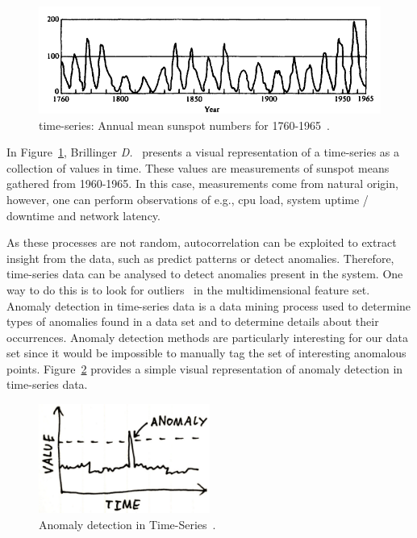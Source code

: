 \begin{figure}[H]
    \centering
    \includegraphics[width=1.00\textwidth]{images/time_series_example.pdf}
    \caption{time-series: Annual mean sunspot numbers for 1760-1965~\cite{Brillinger2006}.}
    \label{fig:time_series_example}
\end{figure}

In Figure~\ref{fig:time_series_example}, Brillinger \textit{D.}~\cite{Brillinger2006} presents a visual representation of a time-series as a collection of values in time. These values are measurements of sunspot means gathered from 1960-1965. In this case, measurements come from natural origin, however, one can perform observations of e.g., \gls{cpu} load, system uptime / downtime and network latency.

As these processes are not random, autocorrelation can be exploited to extract insight from the data, such as predict patterns or detect anomalies. Therefore, time-series data can be analysed to detect anomalies present in the system. One way to do this is to look for outliers~\cite{Liu2004} in the multidimensional feature set. Anomaly detection in time-series data is a data mining process used to determine types of anomalies found in a data set and to determine details about their occurrences. Anomaly detection methods are particularly interesting for our data set since it would be impossible to manually tag the set of interesting anomalous points. Figure~\ref{fig:time_series_anomaly_detection_example} provides a simple visual representation of anomaly detection in time-series data.

\begin{figure}[H]
    \centering
    \includegraphics[width=0.50\textwidth]{images/time_series_anomaly_detection_example.pdf}
    \caption{Anomaly detection in Time-Series~\cite{NikolajBomannMertz}.}
    \label{fig:time_series_anomaly_detection_example}
\end{figure}

